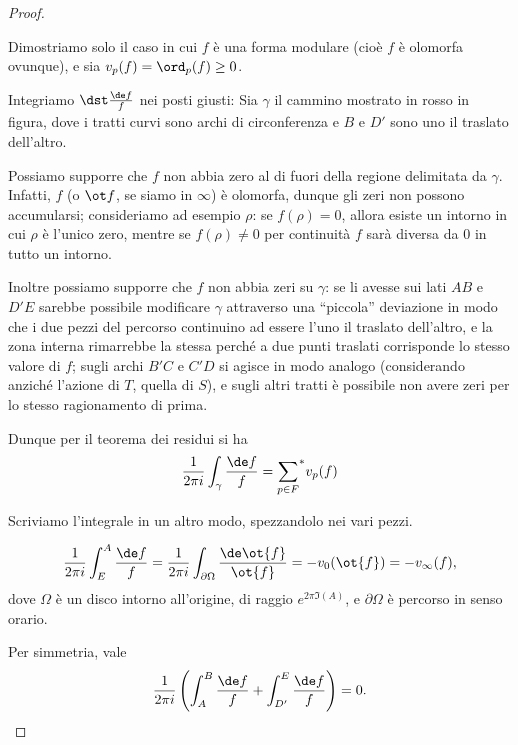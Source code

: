 \begin{proof}
	\begin{figure}
		
	\end{figure}
	Dimostriamo solo il caso in cui $f$ è una forma modulare (cioè $f$ è olomorfa ovunque), e sia $v_p(f)=\ord_p(f)\geq0$.
	
	Integriamo $\dst \frac{\de f}{f}$ nei posti giusti: Sia $\gamma$ il cammino mostrato in rosso in figura, dove i tratti curvi sono archi di circonferenza e $B$ e $D'$ sono uno il traslato dell'altro.
	
	Possiamo supporre che $f$ non abbia zero al di fuori della regione delimitata da $\gamma$.
	Infatti, $f$ (o $\ot f$, se siamo in $\infty$) è olomorfa, dunque gli zeri non possono accumularsi; consideriamo ad esempio $\rho$: se $f(\rho)=0$, allora esiste un intorno in cui $\rho$ è l'unico zero, mentre se $f(\rho)\neq0$ per continuità $f$ sarà diversa da $0$ in tutto un intorno.
	
	Inoltre possiamo supporre che $f$ non abbia zeri su $\gamma$: se li avesse sui lati $AB$ e $D'E$ sarebbe possibile modificare $\gamma$ attraverso una ``piccola'' deviazione in modo che i due pezzi del percorso continuino ad essere l'uno il traslato dell'altro, e la zona interna rimarrebbe la stessa perché a due punti traslati corrisponde lo stesso valore di $f$; sugli archi $B'C$ e $C'D$ si agisce in modo analogo (considerando anziché l'azione di $T$, quella di $S$), e sugli altri tratti è possibile non avere zeri per lo stesso ragionamento di prima.
	
	Dunque per il teorema dei residui si ha
	\begin{equation*}
		\frac{1}{2\pi i} \int_{\gamma} \frac{\de f}{f}={\sum_{p\in F}}^{*}v_p(f)
	\end{equation*}
	
	Scriviamo l'integrale in un altro modo, spezzandolo nei vari pezzi.
	
	\begin{equation*}
		\frac{1}{2\pi i}\int_E^A\frac{\de f}{f}=\frac{1}{2\pi i}\int_{\partial\Omega}\frac{\de \ot{f}}{\ot{f}}=-v_0(\ot{f})=-v_\infty(f),
	\end{equation*}
	dove $\Omega$ è un disco intorno all'origine, di raggio $e^{2\pi \Im(A)}$, e $\partial\Omega$ è percorso in senso orario.
	
	Per simmetria, vale
	\begin{equation*}
		\frac{1}{2\pi i}\left( \int_A^B\frac{\de f}{f} + \int_{D'}^E\frac{\de f}{f} \right) = 0.
	\end{equation*}
	

\end{proof}
